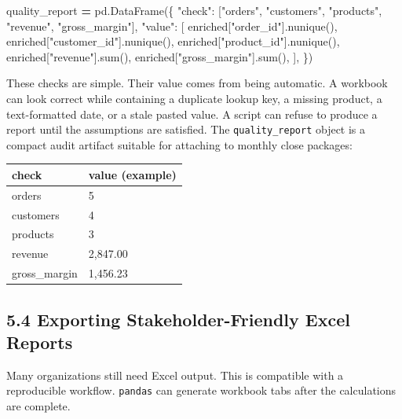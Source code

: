 \documentclass[
  12pt,
]{article}
\newenvironment{Shaded}{\begin{snugshade}}{\end{snugshade}}
\newcommand{\BuiltInTok}[1]{#1}
\newcommand{\NormalTok}[1]{#1}
\newcommand{\OperatorTok}[1]{\textcolor[rgb]{0.81,0.36,0.00}{\textbf{#1}}}
\newcommand{\StringTok}[1]{\textcolor[rgb]{0.31,0.60,0.02}{#1}}
\newcounter{none} %
\begin{document}
\begin{Shaded}
\begin{Highlighting}[]
\NormalTok{quality\_report }\OperatorTok{=}\NormalTok{ pd.DataFrame(\{}
    \StringTok{"check"}\NormalTok{: [}\StringTok{"orders"}\NormalTok{, }\StringTok{"customers"}\NormalTok{, }\StringTok{"products"}\NormalTok{, }\StringTok{"revenue"}\NormalTok{, }\StringTok{"gross\_margin"}\NormalTok{],}
    \StringTok{"value"}\NormalTok{: [}
\NormalTok{        enriched[}\StringTok{"order\_id"}\NormalTok{].nunique(),}
\NormalTok{        enriched[}\StringTok{"customer\_id"}\NormalTok{].nunique(),}
\NormalTok{        enriched[}\StringTok{"product\_id"}\NormalTok{].nunique(),}
\NormalTok{        enriched[}\StringTok{"revenue"}\NormalTok{].}\BuiltInTok{sum}\NormalTok{(),}
\NormalTok{        enriched[}\StringTok{"gross\_margin"}\NormalTok{].}\BuiltInTok{sum}\NormalTok{(),}
\NormalTok{    ],}
\NormalTok{\})}
\end{Highlighting}
\end{Shaded}

These checks are simple. Their value comes from being automatic. A
workbook can look correct while containing a duplicate lookup key, a
missing product, a text-formatted date, or a stale pasted value. A
script can refuse to produce a report until the assumptions are
satisfied. The \texttt{quality\_report} object is a compact audit
artifact suitable for attaching to monthly close packages:

{\def\LTcaptype{none} %
\begin{longtable}[]{@{}ll@{}}
\toprule\noalign{}
check & value (example) \\
\midrule\noalign{}
\endhead
\bottomrule\noalign{}
\endlastfoot
orders & 5 \\
customers & 4 \\
products & 3 \\
revenue & 2,847.00 \\
gross\_margin & 1,456.23 \\
\end{longtable}
}

\subsection{5.4 Exporting Stakeholder-Friendly Excel
Reports}\label{exporting-stakeholder-friendly-excel-reports}

Many organizations still need Excel output. This is compatible with a
reproducible workflow. \texttt{pandas} can generate workbook tabs after
the calculations are complete.
\end{document}
